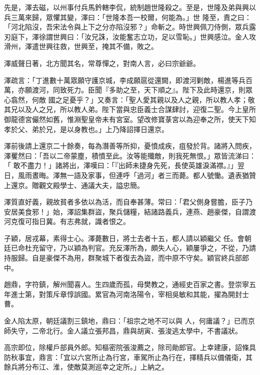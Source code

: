 \begin{pinyinscope}
 先是，澤去磁，以州事付兵馬鈐轄李侃，統制趙世隆殺之。至是，世隆及弟與興以兵三萬來歸，眾懼其變，澤曰：「世隆本吾一校爾，何能為。」世
 隆至，責之曰：「河北陷沒，吾宋法令與上下之分亦陷沒邪？」命斬之。時世興佩刀侍側，眾兵露刃庭下，澤徐謂世興曰：「汝兄誅，汝能奮志立功，足以雪恥。」世興感泣。金人攻滑州，澤遣世興往救，世興至，掩其不備，敗之。



 澤威聲日著，北方聞其名，常尊憚之，對南人言，必曰宗爺爺。



 澤疏言：「丁進數十萬眾願守護京城，李成願扈從還闕，即渡河剿敵，楊進等兵百萬，亦願渡河，同致死力。臣聞『多助之至，天下順之』。陛下及此時還京，則眾心翕然，何敵
 國之足憂乎？」又奏言：「聖人愛其親以及人之親，所以教人孝；敬其兄以及人之兄，所以教人弟。陛下當與忠臣義士合謀肆討，迎復二聖。今上皇所御龍德宮儼然如舊，惟淵聖皇帝未有宮室。望改修寶菉宮以為迎奉之所，使天下知孝於父、弟於兄，是以身教也。」上乃降詔擇日還京。



 澤前後請上還京二十餘奏，每為潛善等所抑，憂憤成疾，疽發於背。諸將入問疾，澤矍然曰：「吾以二帝蒙塵，積憤至此。汝等能殲敵，則我死無恨。」眾皆流涕曰：「
 敢不盡力！」諸將出，澤嘆曰：「『出師未捷身先死，長使英雄淚滿襟。』」翌日，風雨晝晦。澤無一語及家事，但連呼「過河」者三而薨。都人號慟。遺表猶贊上還京。贈觀文殿學士、通議大夫，謚忠簡。



 澤質直好義，親故貧者多依以為活，而自奉甚薄。常曰：「君父側身嘗膽，臣子乃安居美食邪！」始，澤詔集群盜，聚兵儲糧，結諸路義兵，連燕、趙豪傑，自謂渡河克復可指日冀。有志弗就，識者恨之。



 子穎，居戎幕，素得士心。澤薨數日，將士去者十五，都人請以穎繼父
 任。會朝廷已命杜充留守，乃以穎為判官。充反澤所為，頗失人心，穎屢爭之，不從，乃請持服歸。自是豪傑不為用，群聚城下者復去為盜，而中原不守矣。穎官終兵部郎中。



 趙鼎，字符鎮，解州聞喜人。生四歲而孤，母樊教之，通經史百家之書。登崇寧五年進士第，對策斥章惇誤國。累官為河南洛陽令，宰相吳敏和其能，擢為開封士曹。



 金人陷太原，朝廷議割三鎮地，鼎曰：「祖宗之地不可以與
 人，何庸議？」已而京師失守，二帝北行。金人議立張邦昌，鼎與胡寅、張浚逃太學中，不書議狀。



 高宗即位，除權戶部員外郎。知樞密院張浚薦之，除司勛郎官。上幸建康，詔條具防秋事宜，鼎言：「宜以六宮所止為行宮，車駕所止為行在，擇精兵以備儀衛，其餘兵將分布江、淮，使敵莫測巡幸之定所。」上納之。




\end{pinyinscope}
